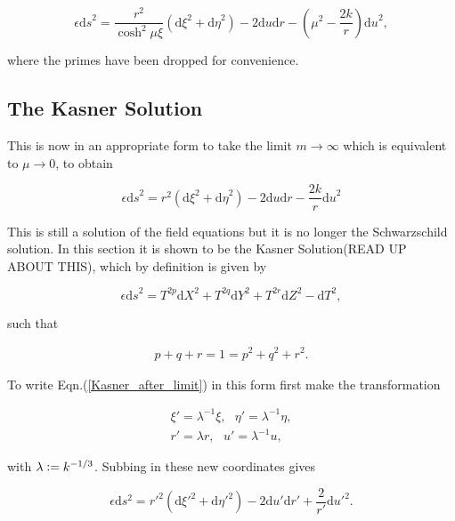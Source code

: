 \begin{equation*}
\epsilon {\mathrm{d}s}^2 = \frac{r^2}{\cosh^{2}{\mu \xi}} ({\mathrm{d}\xi}^2 + {\mathrm{d}\eta}^2) - 2 {\mathrm{d}u}{\mathrm{d}r} - \left( \mu^{2} - \frac{2k}{r} \right) {\mathrm{d}u}^2,
\end{equation*}

\noindent where the primes have been dropped for convenience. 

\subsection{The Kasner Solution}

This is now in an appropriate form to take the limit $m \rightarrow \infty$ which is equivalent to $\mu \rightarrow 0$, to obtain

\begin{equation}\label{Kasner_after_limit}
\epsilon {\mathrm{d}s}^2 = r^2 ({\mathrm{d}\xi}^2 + {\mathrm{d}\eta}^2) - 2 {\mathrm{d}u}{\mathrm{d}r} - \frac{2k}{r} {\mathrm{d}u}^2
\end{equation}

\noindent This is still a solution of the field equations but it is no longer the Schwarzschild solution. In this section it is shown to be the Kasner Solution(READ UP ABOUT THIS), which by definition is given by

\begin{equation}\label{Reparameterise_Definition_Of_Kasner} 
\epsilon {\mathrm{d}s}^2 = T^{2p} {\mathrm{d}X}^2 + T^{2q} \mathrm{d}Y^2 + T^{2r} \mathrm{d}Z^2 - \mathrm{d}T^2,
\end{equation}

\noindent such that

\begin{eqnarray*}
p + q + r = 1 = p^2 + q^2 + r^2.
\end{eqnarray*}

To write Eqn.(\ref{Kasner_after_limit}) in this form first make the transformation

\begin{gather*} 
\xi' = \lambda^{-1} \xi, \text{    }  \eta' = \lambda^{-1} \eta, \\
r' = \lambda r,          \text{    }  u' = \lambda^{-1} u,
\end{gather*}

\noindent with $\lambda \vcentcolon = k^{-1/3}$. Subbing in these new coordinates gives

\begin{equation*}  
\epsilon \mathrm{d} s^2 = {r'}^2 (\mathrm{d} {\xi'}^2 + \mathrm{d} {\eta'}^2) - 2 \mathrm{d} u' \mathrm{d} r' + \frac{2}{r'}\mathrm{d} {u'}^2.
\end{equation*}

